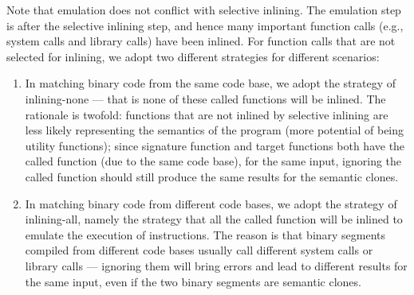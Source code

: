  Note that emulation does not conflict with selective inlining.
The emulation step is after the selective inlining step, and hence many important function calls (e.g., system calls and library calls) have been inlined. For function calls that are not selected for inlining, we adopt two different strategies for different scenarios:
     \begin{enumerate}[itemsep=0.15mm]
     \item In matching binary code from the same code base, we adopt the strategy of inlining-none --- that is none of these called functions will be inlined. The rationale is twofold: functions that are not inlined by selective inlining are less likely representing the semantics of the program (more potential of being utility functions); since signature function and target functions both have the called function (due to the same code base), for the same input, ignoring the called function should still produce the same results for the semantic clones.
     \item In matching binary code from different code bases, we adopt the strategy of inlining-all, namely the strategy that all the called function will be inlined to emulate the execution of instructions. The reason is that binary segments compiled from different code bases usually call different system calls or library calls --- ignoring them will bring errors and lead to different results for the same input, even if the two binary segments are semantic clones.
     \end{enumerate}

